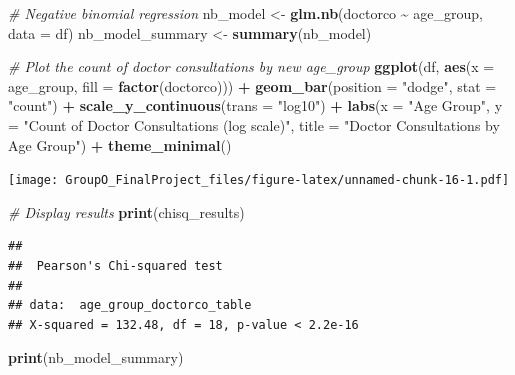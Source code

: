 \documentclass[
]{article}
\newenvironment{Shaded}{\begin{snugshade}}{\end{snugshade}}
\newcommand{\AttributeTok}[1]{\textcolor[rgb]{0.13,0.29,0.53}{#1}}
\newcommand{\CommentTok}[1]{\textcolor[rgb]{0.56,0.35,0.01}{\textit{#1}}}
\newcommand{\FunctionTok}[1]{\textcolor[rgb]{0.13,0.29,0.53}{\textbf{#1}}}
\newcommand{\NormalTok}[1]{#1}
\newcommand{\OtherTok}[1]{\textcolor[rgb]{0.56,0.35,0.01}{#1}}
\newcommand{\SpecialCharTok}[1]{\textcolor[rgb]{0.81,0.36,0.00}{\textbf{#1}}}
\newcommand{\StringTok}[1]{\textcolor[rgb]{0.31,0.60,0.02}{#1}}
\begin{document}
\begin{Shaded}
\begin{Highlighting}[]
\CommentTok{\# Negative binomial regression}
\NormalTok{nb\_model }\OtherTok{\textless{}{-}} \FunctionTok{glm.nb}\NormalTok{(doctorco }\SpecialCharTok{\textasciitilde{}}\NormalTok{ age\_group, }\AttributeTok{data =}\NormalTok{ df)}
\NormalTok{nb\_model\_summary }\OtherTok{\textless{}{-}} \FunctionTok{summary}\NormalTok{(nb\_model)}

\CommentTok{\# Plot the count of doctor consultations by new age\_group}
\FunctionTok{ggplot}\NormalTok{(df, }\FunctionTok{aes}\NormalTok{(}\AttributeTok{x =}\NormalTok{ age\_group, }\AttributeTok{fill =} \FunctionTok{factor}\NormalTok{(doctorco))) }\SpecialCharTok{+} 
  \FunctionTok{geom\_bar}\NormalTok{(}\AttributeTok{position =} \StringTok{"dodge"}\NormalTok{, }\AttributeTok{stat =} \StringTok{"count"}\NormalTok{) }\SpecialCharTok{+}
  \FunctionTok{scale\_y\_continuous}\NormalTok{(}\AttributeTok{trans =} \StringTok{"log10"}\NormalTok{) }\SpecialCharTok{+}
  \FunctionTok{labs}\NormalTok{(}\AttributeTok{x =} \StringTok{"Age Group"}\NormalTok{, }\AttributeTok{y =} \StringTok{"Count of Doctor Consultations (log scale)"}\NormalTok{, }\AttributeTok{title =} \StringTok{"Doctor Consultations by Age Group"}\NormalTok{) }\SpecialCharTok{+}
  \FunctionTok{theme\_minimal}\NormalTok{()}
\end{Highlighting}
\end{Shaded}

\texttt{[image: GroupO\_FinalProject\_files/figure-latex/unnamed-chunk-16-1.pdf]}

\begin{Shaded}
\begin{Highlighting}[]
\CommentTok{\# Display results}
\FunctionTok{print}\NormalTok{(chisq\_results)}
\end{Highlighting}
\end{Shaded}

\begin{verbatim}
## 
##  Pearson's Chi-squared test
## 
## data:  age_group_doctorco_table
## X-squared = 132.48, df = 18, p-value < 2.2e-16
\end{verbatim}

\begin{Shaded}
\begin{Highlighting}[]
\FunctionTok{print}\NormalTok{(nb\_model\_summary)}
\end{Highlighting}
\end{Shaded}
\end{document}
